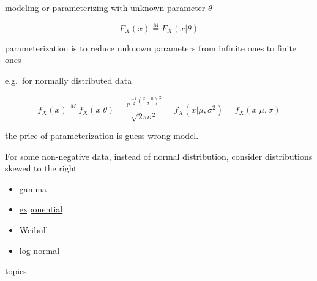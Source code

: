 \documentclass[
]{book}
\providecommand{\tightlist}{%
  \setlength{\itemsep}{0pt}\setlength{\parskip}{0pt}}
\theoremstyle{definition}
\theoremstyle{definition}
\theoremstyle{definition}
\theoremstyle{definition}
\theoremstyle{remark}
\begin{document}
modeling or parameterizing with unknown parameter \(\theta\)

\[
F_{{\scriptscriptstyle X}}\left(x\right)\overset{M}{=}F_{{\scriptscriptstyle X}}\left(x|\theta\right)
\]

parameterization is to reduce unknown parameters from infinite ones to finite ones

e.g.~for normally distributed data

\[
f_{{\scriptscriptstyle X}}\left(x\right)\overset{M}{=}f_{{\scriptscriptstyle X}}\left(x|\theta\right)=\dfrac{\mathrm{e}^{{\scriptscriptstyle \frac{-1}{2}\left(\frac{x-\mu}{\sigma}\right)^{2}}}}{\sqrt{2\pi\sigma^{2}}}=f_{{\scriptscriptstyle X}}\left(x|\mu,\sigma^{2}\right)=f_{{\scriptscriptstyle X}}\left(x|\mu,\sigma\right)
\]

the price of parameterization is guess wrong model.

For some non-negative data, instead of normal distribution, consider distributions skewed to the right

\begin{itemize}
\tightlist
\item
  \href{https://en.wikipedia.org/wiki/Gamma_distribution}{gamma}
\item
  \href{https://en.wikipedia.org/wiki/Exponential_distribution}{exponential}
\item
  \href{https://en.wikipedia.org/wiki/Weibull_distribution}{Weibull}
\item
  \href{https://en.wikipedia.org/wiki/Log-normal_distribution}{log-normal}
\end{itemize}

topics
\end{document}
